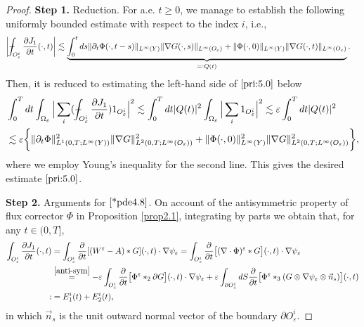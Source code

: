 \documentclass[13pt,CJK]{article}
\theoremstyle{plain}                       %
\theoremstyle{remark}
\numberwithin{equation}{section}
\def\Xint#1{\mathchoice
  {\XXint\displaystyle\textstyle{#1}}%
  {\XXint\textstyle\scriptstyle{#1}}%
  {\XXint\scriptstyle\scriptscriptstyle{#1}}%
  {\XXint\scriptscriptstyle\scriptscriptstyle{#1}}%
  \!\int}
\def\XXint#1#2#3{{\setbox0=\hbox{$#1{#2#3}{\int}$}
  \vcenter{\hbox{$#2#3$}}\kern-.5\wd0}}
\def\dashint{\Xint-}
\begin{document}
\begin{proof}
\textbf{Step 1.} Reduction. For a.e. $t\geq 0$,
we manage to establish the following uniformly
bounded estimate with respect to the index $i$, i.e.,
\begin{equation}\label{*pde4.8}
\begin{aligned}
\bigg|\dashint_{O_{\varepsilon}^i}\frac{\partial J_1}{\partial t}(\cdot,t)\bigg|
&\lesssim
\underbrace{\int_{0}^{t}ds\|\partial_t
\Phi(\cdot,t-s)\|_{L^{\infty}(Y)}\|\nabla G(\cdot,s)\|_{L^{\infty}
(O_\varepsilon)}
+\|\Phi(\cdot,0)\|_{L^{\infty}(Y)}\|\nabla G(\cdot,t)\|_{L^{\infty}
(O_\varepsilon)}}_{=:Q(t)}.
\end{aligned}
\end{equation}
Then, it is reduced to estimating the left-hand side of $\eqref{pri:5.0}$ below
\begin{equation*}
\begin{aligned}
&
\int_{0}^{T}dt\int_{\Omega_{\varepsilon}}\Big|
\sum_{i}(\dashint_{O_{\varepsilon}^i}\frac{\partial J_1}{\partial t}) 1_{O_{\varepsilon}^i}\Big|^2
\lesssim  \int_{0}^{T}dt |Q(t)|^2\int_{\Omega_{\varepsilon}}\Big|
\sum_{i} 1_{O_{\varepsilon}^i}
\Big|^2
\lesssim \varepsilon\int_{0}^{T}dt |Q(t)|^2\\
&\lesssim
\varepsilon\bigg\{
\|\partial_t\Phi\|_{L^1(0,T;L^\infty(Y))}^2
\|\nabla G\|_{L^2(0,T;L^\infty(O_\varepsilon))}^2
+
\|\Phi(\cdot,0)\|_{L^{\infty}(Y)}^2
\|\nabla G\|_{L^2(0,T;L^{\infty}(O_\varepsilon))}^2
\bigg\},
\end{aligned}
\end{equation*}
where we employ Young's inequality for the second line.
This gives the desired estimate $\eqref{pri:5.0}$.


\textbf{Step 2.} Arguments for $\eqref{*pde4.8}$.
On account of the antisymmetric property of flux corrector $\Phi$ in Proposition \ref{prop2.1},
integrating by parts we obtain that, for any $t\in(0,T]$,
\begin{equation}\label{*pde4.9}
\begin{aligned}
  \int_{O_{\varepsilon}^i}\frac{\partial J_1}{\partial t}(\cdot,t)
  &=\int_{O_{\varepsilon}^i}
  \frac{\partial}{\partial t}
  [(W^{\varepsilon}-A)\ast G](\cdot,t)\cdot\nabla \psi_{\varepsilon}
  =\int_{O_{\varepsilon}^i}
  \frac{\partial}{\partial t}
  \big[(\nabla \cdot\Phi)^\varepsilon\ast G\big](\cdot,t)\cdot\nabla \psi_{\varepsilon}\\
  &\overset{\eqref{anti-sym}}{=}
  -\varepsilon\int_{O_{\varepsilon}^i}
  \frac{\partial}{\partial t}\big[
  \Phi^\varepsilon\ast_2\partial G\big](\cdot,t)\cdot\nabla\psi_{\varepsilon}
  +\varepsilon
  \int_{\partial O_{\varepsilon}^i}dS\frac{\partial}{\partial t}
  \big[\Phi^\varepsilon\ast_3 (G\otimes\nabla\psi_{\varepsilon}\otimes
  \vec{n}_s)\big](\cdot,t)\\
  :&=E_{1}^i(t)+E_{2}^i(t),
  \end{aligned}
\end{equation}
in which $\vec{n}_s$ is the unit outward normal vector of the boundary $\partial O_{\varepsilon}^i$.


\end{proof}
\end{document}
